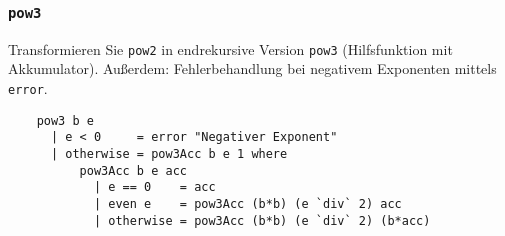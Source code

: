 \documentclass{beamer}
\begin{document}
\begin{frame}[fragile]
  \frametitle{\lstinline{pow3}}
  Transformieren Sie \lstinline{pow2} in endrekursive Version \lstinline{pow3} (Hilfsfunktion mit Akkumulator).
  Außerdem: Fehlerbehandlung bei negativem Exponenten mittels \lstinline{error}.
  \pause
  \begin{lstlisting}
    pow3 b e
      | e < 0     = error "Negativer Exponent"
      | otherwise = pow3Acc b e 1 where
          pow3Acc b e acc
            | e == 0    = acc
            | even e    = pow3Acc (b*b) (e `div` 2) acc
            | otherwise = pow3Acc (b*b) (e `div` 2) (b*acc)
  \end{lstlisting}
\end{frame}
\end{document}
